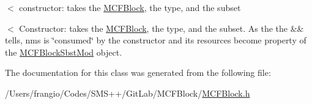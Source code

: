 $<$ constructor\+: takes the \mbox{\hyperlink{class_s_m_spp__di__unipi__it_1_1_m_c_f_block}{M\+C\+F\+Block}}, the type, and the subset 

$<$ Constructor\+: takes the \mbox{\hyperlink{class_s_m_spp__di__unipi__it_1_1_m_c_f_block}{M\+C\+F\+Block}}, the type, and the subset. As the the \&\& tells, nms is \char`\"{}consumed\char`\"{} by the constructor and its resources become property of the \mbox{\hyperlink{class_s_m_spp__di__unipi__it_1_1_m_c_f_block_sbst_mod}{M\+C\+F\+Block\+Sbst\+Mod}} object. 

The documentation for this class was generated from the following file\+:\begin{DoxyCompactItemize}
\item 
/\+Users/frangio/\+Codes/\+S\+M\+S++/\+Git\+Lab/\+M\+C\+F\+Block/\mbox{\hyperlink{_m_c_f_block_8h}{M\+C\+F\+Block.\+h}}\end{DoxyCompactItemize}
